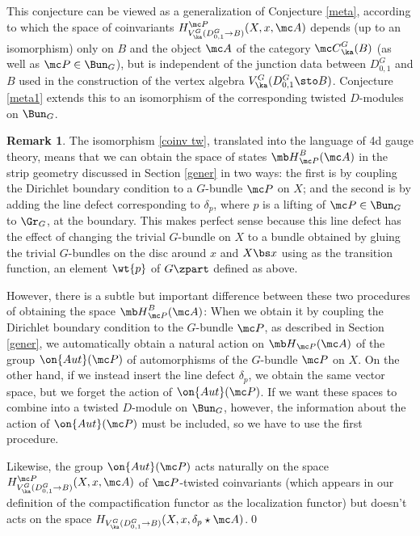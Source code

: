 \documentclass[11pt,reqno]{amsart}
\theoremstyle{plain}
\numberwithin{equation}{section}
\theoremstyle{definition}
\newtheorem{rem}{Remark}[section]
\begin{document}
This conjecture can be viewed as a generalization of Conjecture
\ref{meta}, according to which the space of coinvariants
$H_{V^G_\ka(D^G_{0,1}\to B)}^{\mc P}(X,x,{\mc A})$ depends (up to an
isomorphism) only on $B$ and the object ${\mc A}$ of the category
${\mc C}^G_\ka(B)$ (as well as ${\mc P} \in \Bun_G$), but is
independent of the junction data between $D^G_{0,1}$ and $B$ used in
the construction of the vertex algebra $V^G_\ka(D^G_{0,1}\sto
B)$. Conjecture \ref{meta1} extends this to an isomorphism of the
corresponding twisted $D$-modules on $\Bun_G$.

\bigskip

\begin{rem}    \label{p and P}
The isomorphism \eqref{coinv tw}, translated
into the language of 4d gauge theory, means that we can obtain the
space of states ${\mb H}^B_{\mc P}({\mc A})$ in the strip geometry
discussed in Section \ref{gener} in two ways: the first is by coupling
the Dirichlet boundary condition to a $G$-bundle ${\mc P}$ on $X$; and
the second is by adding the line defect corresponding to $\delta_p$,
where $p$ is a lifting of ${\mc P} \in \Bun_G$ to $\Gr_G$, at the
boundary. This makes perfect sense because this line defect has the
effect of changing the trivial $G$-bundle on $X$ to a bundle obtained
by gluing the trivial $G$-bundles on the disc around $x$ and $X\bs x$
using as the transition function, an element $\wt{p}$ of $G\zpart$
defined as above.

However, there is a subtle but important difference between these two
procedures of obtaining the space ${\mb H}^B_{\mc P}({\mc A})$: When
we obtain it by coupling the Dirichlet boundary condition to the
$G$-bundle ${\mc P}$, as described in Section \ref{gener}, we
automatically obtain a natural action on ${\mb H}_{\mc P}({\mc A})$ of
the group $\on{Aut}({\mc P})$ of automorphisms of the $G$-bundle ${\mc
  P}$ on $X$. On the other hand, if we instead insert the line defect
$\delta_p$, we obtain the same vector space, but we forget the action
of $\on{Aut}({\mc P})$. If we want these spaces to combine into a
twisted $D$-module on $\Bun_G$, however, the information about the
action of $\on{Aut}({\mc P})$ must be included, so we have to use the
first procedure.

Likewise, the group $\on{Aut}({\mc P})$ acts naturally on the space
$H_{V^G_\ka(D^G_{0,1}\to B)}^{\mc P}(X,x,{\mc A})$ of ${\mc
  P}$-twisted coinvariants (which appears in our definition of the
compactification functor as the localization functor) but doesn't
acts on the space $H_{V^G_\ka(D^G_{0,1}\to B)}(X,x,\delta_p \star {\mc
  A})$.\qed
\end{rem}
\end{document}
